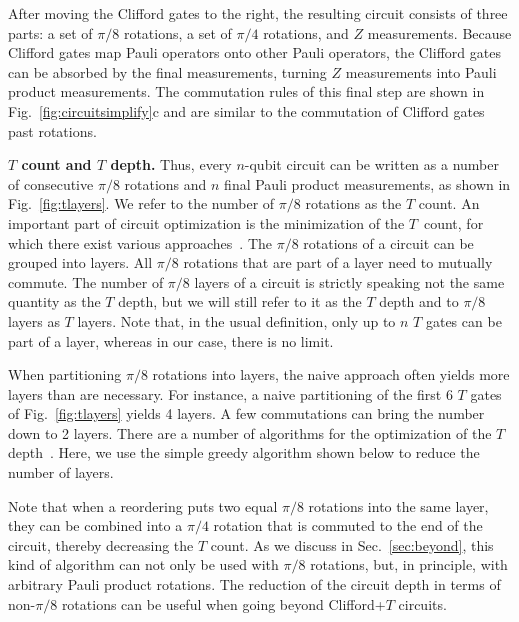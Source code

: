 \documentclass[prx,aps,letterpaper,twocolumn,allowfontchageintitle=true,accepted=2019-02-01]{quantumarticle}
\begin{document}
After moving the Clifford gates to the right, the resulting circuit consists of three parts: a set of $\pi/8$ rotations, a set of $\pi/4$ rotations, and $Z$ measurements. Because Clifford gates map Pauli operators onto other Pauli operators, the Clifford gates can be absorbed by the final measurements, turning $Z$ measurements into Pauli product measurements. The commutation rules of this final step are shown in Fig.~\ref{fig:circuitsimplify}c and are similar to the commutation of Clifford gates past rotations.


 
\textbf{$T$ count and $T$ depth.} Thus, every $n$-qubit circuit can be written as a number of consecutive $\pi/8$ rotations and $n$ final Pauli product measurements, as shown in Fig.~\ref{fig:tlayers}. We refer to the number of $\pi/8$ rotations as the $T$ count. An important part of circuit optimization is the minimization of the $T$~count, for which there exist various approaches~\cite{Kliuchnikov2012,Kliuchnikov2013,Gosset2013,Heyfron2017}. The $\pi/8$ rotations of a circuit can be grouped into layers. All $\pi/8$ rotations that are part of a layer need to mutually commute. The number of $\pi/8$ layers of a circuit is strictly speaking not the same quantity as the $T$ depth, but we will still refer to it as the $T$ depth and to $\pi/8$ layers as $T$ layers. Note that, in the usual definition, only up to $n$ $T$ gates can be part of a layer, whereas in our case, there is no limit.

When partitioning $\pi/8$ rotations into layers, the naive approach often yields more layers than are necessary. For instance, a naive partitioning of the first 6 $T$ gates of Fig.~\ref{fig:tlayers} yields 4 layers. A few commutations can bring the number down to 2 layers. There are a number of algorithms for the optimization of the $T$ depth~\cite{Amy2013,Selinger2013,Amy2014}. Here, we use the simple greedy algorithm shown below to reduce the number of layers.



Note that when a reordering puts two equal $\pi/8$ rotations into the same layer, they can be combined into a $\pi/4$ rotation that is commuted to the end of the circuit, thereby decreasing the $T$ count. As we discuss in Sec.~\ref{sec:beyond}, this kind of algorithm can not only be used with $\pi/8$ rotations, but, in principle, with arbitrary Pauli product rotations. The reduction of the circuit depth in terms of non-$\pi/8$ rotations can be useful when going beyond Clifford+$T$ circuits.
\end{document}
